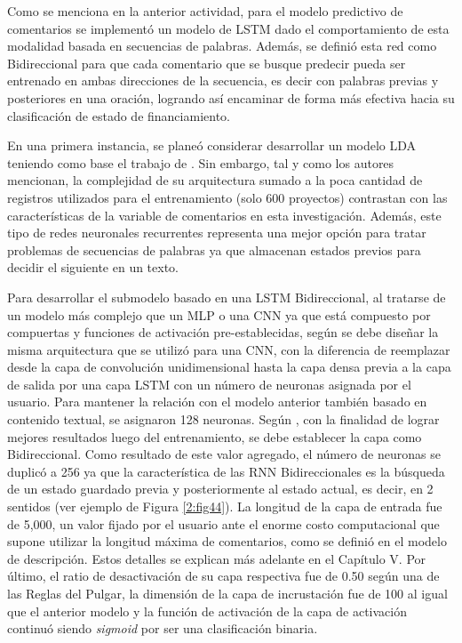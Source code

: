 Como se menciona en la anterior actividad, para el modelo predictivo de comentarios se implementó un modelo de LSTM dado el comportamiento de esta modalidad basada en secuencias de palabras. Además, se definió esta red como Bidireccional para que cada comentario que se busque predecir pueda ser entrenado en ambas direcciones de la secuencia, es decir con palabras previas y posteriores en una oración, logrando así encaminar de forma más efectiva hacia su clasificación de estado de financiamiento.

En una primera instancia, se planeó considerar desarrollar un modelo LDA teniendo como base el trabajo de \cite{pr_shafqat2019topicpredictions}. Sin embargo, tal y como los autores mencionan, la complejidad de su arquitectura sumado a la poca cantidad de registros utilizados para el entrenamiento (solo 600 proyectos) contrastan con las características de la variable de comentarios en esta investigación. Además, este tipo de redes neuronales recurrentes representa una mejor opción para tratar problemas de secuencias de palabras ya que almacenan estados previos para decidir el siguiente en un texto.

Para desarrollar el submodelo basado en una LSTM Bidireccional, al tratarse de un modelo más complejo que un MLP o una CNN ya que está compuesto por compuertas y funciones de activación pre-establecidas, según \cite{tec_malik2019pythonnlp} se debe diseñar la misma arquitectura que se utilizó para una CNN, con la diferencia de reemplazar desde la capa de convolución unidimensional hasta la capa densa previa a la capa de salida por una capa LSTM con un número de neuronas asignada por el usuario. Para mantener la relación con el modelo anterior también basado en contenido textual, se asignaron 128 neuronas. Según \cite{tec_brownlee2017bidirectional_lstm}, con la finalidad de lograr mejores resultados luego del entrenamiento, se debe establecer la capa como Bidireccional. Como resultado de este valor agregado, el número de neuronas se duplicó a 256 ya que la característica de las RNN Bidireccionales es la búsqueda de un estado guardado previa y posteriormente al estado actual, es decir, en 2 sentidos (ver ejemplo de Figura \ref{2:fig44}). La longitud de la capa de entrada fue de 5,000, un valor fijado por el usuario ante el enorme costo computacional que supone utilizar la longitud máxima de comentarios, como se definió en el modelo de descripción. Estos detalles se explican más adelante en el Capítulo V. Por último, el ratio de desactivación de su capa respectiva fue de 0.50 según una de las Reglas del Pulgar, la dimensión de la capa de incrustación fue de 100 al igual que el anterior modelo y la función de activación de la capa de activación continuó siendo \textit{sigmoid} por ser una clasificación binaria.

